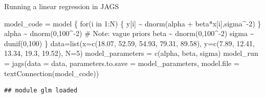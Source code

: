 \documentclass[
  ignorenonframetext,
  aspectratio=169]{beamer}
\newenvironment{Shaded}{\begin{snugshade}}{\end{snugshade}}
\newcommand{\AttributeTok}[1]{\textcolor[rgb]{0.77,0.63,0.00}{#1}}
\newcommand{\DecValTok}[1]{\textcolor[rgb]{0.00,0.00,0.81}{#1}}
\newcommand{\FloatTok}[1]{\textcolor[rgb]{0.00,0.00,0.81}{#1}}
\newcommand{\FunctionTok}[1]{\textcolor[rgb]{0.00,0.00,0.00}{#1}}
\newcommand{\NormalTok}[1]{#1}
\newcommand{\OtherTok}[1]{\textcolor[rgb]{0.56,0.35,0.01}{#1}}
\newcommand{\StringTok}[1]{\textcolor[rgb]{0.31,0.60,0.02}{#1}}
\begin{document}
\begin{frame}[fragile]{Running a linear regression in JAGS}
\protect\hypertarget{running-a-linear-regression-in-jags}{}
\begin{Shaded}
\begin{Highlighting}[]
\NormalTok{model\_code }\OtherTok{=}\StringTok{\textquotesingle{}}
\StringTok{model \{}
\StringTok{  for(i in 1:N) \{ }
\StringTok{    y[i] \textasciitilde{} dnorm(alpha + beta*x[i],sigma\^{}{-}2) }
\StringTok{  \}}
\StringTok{  alpha \textasciitilde{} dnorm(0,100\^{}{-}2) \# Note: vague priors}
\StringTok{  beta \textasciitilde{} dnorm(0,100\^{}{-}2)}
\StringTok{  sigma \textasciitilde{} dunif(0,100)}
\StringTok{\}}
\StringTok{\textquotesingle{}}
\NormalTok{data}\OtherTok{=}\FunctionTok{list}\NormalTok{(}\AttributeTok{x=}\FunctionTok{c}\NormalTok{(}\FloatTok{18.07}\NormalTok{, }\FloatTok{52.59}\NormalTok{, }\FloatTok{54.93}\NormalTok{, }\FloatTok{79.31}\NormalTok{, }\FloatTok{89.58}\NormalTok{),}
          \AttributeTok{y=}\FunctionTok{c}\NormalTok{(}\FloatTok{7.89}\NormalTok{, }\FloatTok{12.41}\NormalTok{, }\FloatTok{13.34}\NormalTok{, }\FloatTok{19.3}\NormalTok{, }\FloatTok{19.52}\NormalTok{),}
          \AttributeTok{N=}\DecValTok{5}\NormalTok{)}
\NormalTok{model\_parameters }\OtherTok{=} \FunctionTok{c}\NormalTok{(}\StringTok{\textquotesingle{}alpha\textquotesingle{}}\NormalTok{, }\StringTok{\textquotesingle{}beta\textquotesingle{}}\NormalTok{, }\StringTok{\textquotesingle{}sigma\textquotesingle{}}\NormalTok{)}
\NormalTok{model\_run }\OtherTok{=} \FunctionTok{jags}\NormalTok{(}\AttributeTok{data =}\NormalTok{ data,}
                 \AttributeTok{parameters.to.save =}\NormalTok{ model\_parameters,}
                 \AttributeTok{model.file =} \FunctionTok{textConnection}\NormalTok{(model\_code))}
\end{Highlighting}
\end{Shaded}

\begin{verbatim}
## module glm loaded
\end{verbatim}
\end{frame}
\end{document}
